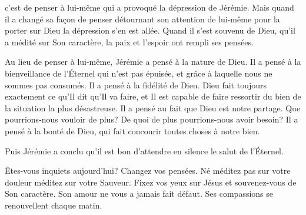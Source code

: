 



 c'est de penser à lui-même
 qui a provoqué la dépression de Jérémie.
 Mais quand il a changé sa façon de penser
 \ocadr détournant son attention de lui-même pour la porter sur Dieu \fcadr{}
 la dépression s'en est allée. Quand il s'est souvenu de Dieu,
 qu'il a médité sur Son caractère, la paix et l'espoir ont rempli ses pensées. 


Au lieu de penser à lui-même, Jérémie a pensé à la nature de Dieu.
 Il a pensé à la bienveillance de l'Éternel qui n'est pas épuisée,
 et grâce à laquelle nous ne sommes pas consumés.
 Il a pensé à la fidélité de Dieu. Dieu fait toujours exactement
 ce qu'Il dit qu'Il va faire, et Il est capable de faire ressortir du bien
 de la situation la plus désastreuse. Il a pensé au fait que Dieu
 est notre partage. Que pourrions-nous vouloir de plus?
 De quoi de plus pourrions-nous avoir besoin?
 Il a pensé à la bonté de Dieu,
 qui fait concourir toutes choses à notre bien. 

Puis Jérémie a conclu qu'il est bon \og d'attendre en silence
 le salut de l'Éternel. \fg{}

Êtes-vous inquiets aujourd'hui? Changez vos pensées.
 Né méditez pas sur votre douleur \ocadr méditez sur votre Sauveur.
 Fixez vos yeux sur Jésus et souvenez-vous de Son caractère.
 Son amour ne vous a jamais fait défaut.
 Ses compassions se renouvellent chaque matin. 

\dvrule




